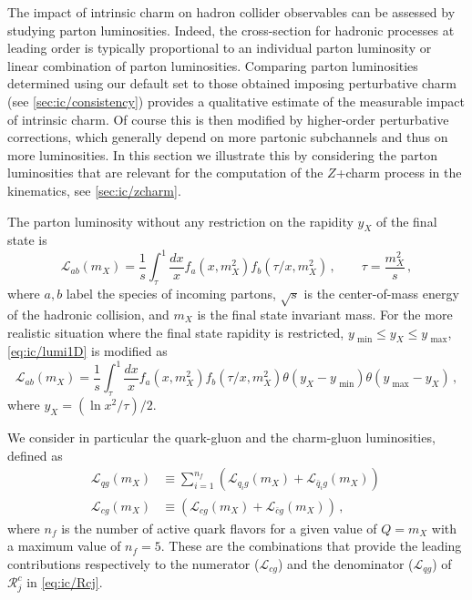
The impact of intrinsic charm on hadron collider observables can be
assessed by studying  parton luminosities. Indeed, the
cross-section for hadronic processes at leading order is typically
proportional to an individual parton luminosity or linear combination
of parton luminosities.
%
Comparing parton luminosities determined
using our default \pdf set to those obtained imposing perturbative
charm (see \cref{sec:ic/consistency}) provides a qualitative estimate of the
measurable impact of intrinsic charm. Of course this is then modified
by higher-order
perturbative corrections, which generally depend on more partonic
subchannels and thus on more luminosities.
%
In this section we illustrate this by considering the parton
luminosities that are relevant for the computation of the
$Z$+charm process in the \lhcb kinematics, see \cref{sec:ic/zcharm}.

The parton luminosity without any restriction on the rapidity $y_X$ of the final state is
\begin{equation}
\label{eq:ic/lumi1D}
\mathcal{L}_{ab}(m_X)= \frac{1}{s}\int_{\tau}^1 \frac{dx}{x}f_a \left( x,m_X^2\right)
f_b\left( \tau/x,m_X^2\right) \, ,\qquad
\tau=\frac{m_X^2}{s} \, ,
\end{equation}
where $a,b$ label the species of incoming partons, $\sqrt{s}$ is the center-of-mass energy of
the hadronic collision, and $m_X$ is the final state invariant mass.
%
For the more realistic situation where the final state rapidity
is restricted, $y_\textrm{ min}\le y_X\le y_\textrm{ max}$,
\cref{eq:ic/lumi1D} is modified as
\begin{equation}
\label{eq:ic/lumi1D_restricted}
\mathcal{L}_{ab}(m_X)= \frac{1}{s}\int_{\tau}^1 \frac{dx}{x}f_a \left( x,m_X^2\right)
f_b\left( \tau/x,m_X^2\right) \theta\left( y_X-y_\textrm{ min}  \right)
\theta\left( y_\textrm{ max}-y_X  \right)\, , 
\end{equation}
where $y_X = \left( \ln x^2/\tau \right) /2$.

We consider in particular the quark-gluon and the charm-gluon luminosities, defined as
\begin{align}
  \mathcal{L}_{qg}(m_X)&\equiv \sum_{i=1}^{n_f} \left( \mathcal{L}_{q_ig}(m_X)+
  \mathcal{L}_{\bar{q}_ig}(m_X) \right)\, \nonumber\\
  \mathcal{L}_{cg}(m_X)&\equiv  \left( \mathcal{L}_{cg}(m_X)+
  \mathcal{L}_{\bar{c}g}(m_X) \right)\, , 
  \label{eq:ic/lumis}
\end{align}
where $n_f$ is the number of active quark flavors for a given value of $Q=m_X$
with a maximum value of $n_f=5$.
%
These are the combinations that provide the leading contributions
respectively to the numerator ($\mathcal{L}_{cg}$) and the 
denominator
($\mathcal{L}_{qg}$) of  $\mathcal{R}_j^c$ in \cref{eq:ic/Rcj}. 

